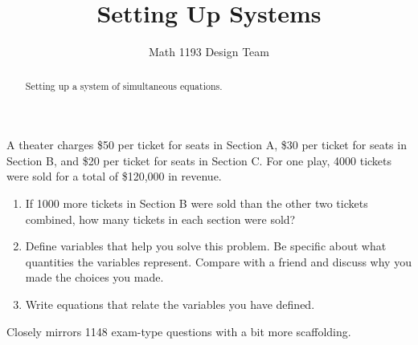 \documentclass[noauthor]{ximera}
\title{Setting Up Systems}
\author{Math 1193 Design Team}
\begin{document}
\begin{abstract}
    Setting up a system of simultaneous equations.
\end{abstract}
\maketitle

A theater charges \$50 per ticket for seats in Section A, 
\$30 per ticket for seats in Section B, and \$20 per ticket 
for seats in Section C. For one play, 4000 tickets were sold 
for a total of \$120,000 in revenue. 

\begin{enumerate}
    \item If 1000 more tickets in Section B were sold 
    than the other two tickets combined, how many tickets 
    in each section were sold?
    \item Define variables that help you solve this 
    problem. Be specific about what quantities the variables
    represent. Compare with a friend and discuss why you made 
    the choices you made.
    \item Write equations that relate the variables you 
    have defined.
\end{enumerate}

\begin{instructorNotes}
Closely mirrors 1148 exam-type questions with a bit more scaffolding.
\end{instructorNotes}
\end{document}
